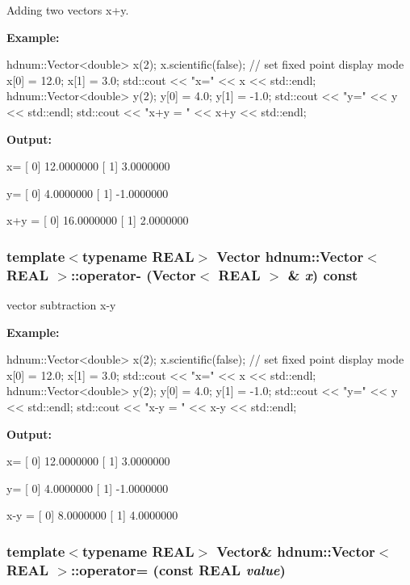 Adding two vectors x+y. 

{\bfseries Example:} 
\begin{DoxyCode}
hdnum::Vector<double> x(2);
x.scientific(false); // set fixed point display mode
x[0] = 12.0;
x[1] = 3.0;
std::cout << "x=" << x << std::endl;
hdnum::Vector<double> y(2);
y[0] = 4.0;
y[1] = -1.0;
std::cout << "y=" << y << std::endl;
std::cout << "x+y = " << x+y << std::endl;
\end{DoxyCode}


{\bfseries Output:} \begin{DoxyVerb}
x=
[ 0]     12.0000000
[ 1]      3.0000000

y=
[ 0]      4.0000000
[ 1]     -1.0000000

x+y = 
[ 0]     16.0000000
[ 1]      2.0000000
	  \end{DoxyVerb}
 \hypertarget{classhdnum_1_1Vector_af44713378f5150c2d12a981e6641f09a}{
\subsubsection[{operator-\/}]{\setlength{\rightskip}{0pt plus 5cm}template$<$typename REAL$>$ {\bf Vector} {\bf hdnum::Vector}$<$ REAL $>$::operator-\/ ({\bf Vector}$<$ REAL $>$ \& {\em x}) const}}
\label{classhdnum_1_1Vector_af44713378f5150c2d12a981e6641f09a}


vector subtraction x-\/y 

{\bfseries Example:} 
\begin{DoxyCode}
hdnum::Vector<double> x(2);
x.scientific(false); // set fixed point display mode
x[0] = 12.0;
x[1] = 3.0;
std::cout << "x=" << x << std::endl;
hdnum::Vector<double> y(2);
y[0] = 4.0;
y[1] = -1.0;
std::cout << "y=" << y << std::endl;
std::cout << "x-y = " << x-y << std::endl;
\end{DoxyCode}


{\bfseries Output:} \begin{DoxyVerb}
x=
[ 0]     12.0000000
[ 1]      3.0000000

y=
[ 0]      4.0000000
[ 1]     -1.0000000

x-y = 
[ 0]      8.0000000
[ 1]      4.0000000
	  \end{DoxyVerb}
 \hypertarget{classhdnum_1_1Vector_a1cc1f492977e5e6dcf600024b2a75492}{
\subsubsection[{operator=}]{\setlength{\rightskip}{0pt plus 5cm}template$<$typename REAL$>$ {\bf Vector}\& {\bf hdnum::Vector}$<$ REAL $>$::operator= (const REAL {\em value})}}
\label{classhdnum_1_1Vector_a1cc1f492977e5e6dcf600024b2a75492}


